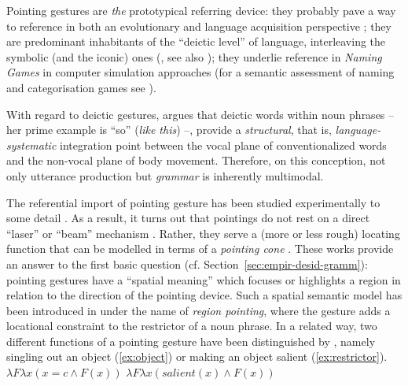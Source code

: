 \documentclass[output=paper]{langsci/langscibook}
\begin{document}
 
Pointing gestures are \emph{the} prototypical referring device:
%
they probably pave a way to reference in both an evolutionary and language acquisition perspective \citep{Bruner:1998,Masataka:2003,Matthews:Behne:Lieven:Tomasello:2012};
%
they are predominant inhabitants of the \enquote{deictic level} of language, interleaving the symbolic (and the iconic) ones (\citealp{Levinson:2008}, see also \citealp{Buehler:1934:ORIG});
%
they underlie reference in \textit{Naming Games} in computer simulation approaches \citep{Steels:1995} (for a semantic assessment of naming and categorisation games see \citealp{Luecking:Mehler:2012}).  


With regard to deictic gestures, \citet[Sec.~5.4]{Fricke:2012} argues that deictic words  within noun phrases -- her prime example is  \enquote{so} (\textit{like this}) --, provide a \emph{structural}, that is, \emph{language-systematic} integration point between the vocal plane of conventionalized words and the non-vocal plane of body movement. 
%
Therefore, on this conception, not only utterance production but \emph{grammar} is inherently multimodal. 

The referential import of pointing gesture has been studied experimentally to some detail \citep{Bangerter:Oppenheimer:2006,Kranstedt:Luecking:Pfeiffer:Rieser:Wachsmuth:2006:a,Kranstedt:Luecking:Pfeiffer:Rieser:Wachsmuth:2006:b,van:der:Sluis:Krahmer:2007}. 
%
As a result, it turns out that pointings do not rest on a direct \enquote{laser} or \enquote{beam} mechanism \citep{McGinn:1981}.
%
Rather, they serve a (more or less rough) locating function \citep{Clark:1996} that can be modelled in terms of a \emph{pointing cone} \citep{Kranstedt:Luecking:Pfeiffer:Rieser:Wachsmuth:2006:a,Luecking:Pfeiffer:Rieser:2015}. 
%
These works provide an answer to the first basic question (cf. Section~\ref{sec:empir-desid-gramm}): pointing gestures have a \enquote{spatial meaning} which focuses or highlights a region in relation to the direction of the pointing device.
%
Such a spatial semantic model has been introduced in \citet{Rieser:2004} under the name of \emph{region pointing}, where the gesture adds a locational constraint to the restrictor of a noun phrase.
%
In a related way, two different functions of a pointing gesture have been distinguished by \citet{Kuehnlein:Nimke:Stegmann:2002}, namely singling out an object (\ref{ex:object}) or making an object salient (\ref{ex:restrictor}).
%
\ea \label{ex:pointing-functions}
\ea \label{ex:object}
$\lambda F \lambda x (x = c \wedge F(x))$
\z
\ea \label{ex:restrictor}
$\lambda F \lambda x (\textit{salient}(x) \wedge F(x))$
\z 
\z
\end{document}
